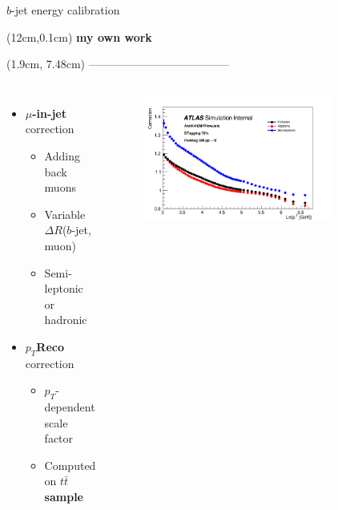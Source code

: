 \begin{frame}{$b$-jet energy calibration}
\begin{textblock*}{5cm}(12cm,0.1cm) %
   \textcolor{HHred}{\Large\textbf{my own work}}
\end{textblock*}
\begin{textblock*}{5cm}(1.9cm, 7.48cm) 
--------------------------------------
\end{textblock*}
\begin{columns}
\begin{itemize}
    \item \textcolor{HHred}{\textbf{$\mu$-in-jet} correction}
    \begin{itemize}
        \item Adding back muons
        \item Variable $\Delta R$($b$-jet, muon) 
        \item Semi-leptonic or hadronic
    \end{itemize}
    \item \textcolor{HHturquoise_d}{\textbf{$p_T$Reco} correction}
    \begin{itemize}
        \item $p_T$-dependent scale factor
        \item Computed on \textbf{$t\bar{t}$ sample}
    \end{itemize}
\end{itemize}
\begin{figure}
    \centering
    \includegraphics[width=0.8\textwidth]{Part3/Img/ptrecopflow.png}
\end{figure}


\end{columns}
\end{frame}
